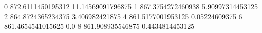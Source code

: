 0 872.6111450195312 11.14569091796875
1 867.3754272460938 5.90997314453125
2 864.8724365234375 3.406982421875
4 861.5177001953125 0.05224609375
6 861.4654541015625 0.0
8 861.908935546875 0.4434814453125
